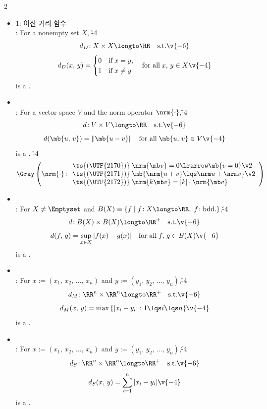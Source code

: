 \documentclass[dvipdfmx,a4paper,titlepage,9pt]{jsarticle}
\begin{document}
\begin{multicols*}{2}
\begin{itemize}[label=-]
\item{}\h1{\scriptsize\Gray: 이산 거리 함수} \\
: For a nonempty set $X$, \v{-4}
$$d_D\!:X\times X\longto \RR\quad\text{s.t.}\v{-6}$$
$$d_D(x,\,y)=\begin{cases}0&\text{if}\;x=y,\\1&\text{if}\;x\neq y\end{cases}\quad\text{for all}\;x,\,y\in X\v{-4}$$
\;\;is a .\\

\item{} \\
: For a vector space $V$ and the norm operator $\nrm{\cdot}$,\v{-4}
$$d\!:V\times V\longto\RR\quad\text{s.t.}\v{-6}$$
$$d(\mb{u,\,v})=\lVert\mb{u-v}\rVert\quad\text{for all}\;\mb{u,\,v}\in V\v{-4}$$
is a . \v{-4}\\
$$\Gray
  \left(\nrm{\cdot}\!:\begin{array}{l}
                      \text{\ts{(\UTF{2170})}}\;\nrm{\mb v}=0\Lrarrow\mb{v=0} \v2 \\
                      \text{\ts{(\UTF{2171})}}\;\mb{\nrm{u+v}\lqs\nrm u+\nrm v} \v2 \\
                      \text{\ts{(\UTF{2172})}}\;\nrm{k\mb v}=|k|\cdot\nrm{\mb v}
                      \end{array}\right)$$

\vfill\null\columnbreak

\item{} \\
: For $X\neq\Emptyset$ and $B(X)\equiv\{f\mid f\!:X\longto\RR,\;f\!:\text{bdd.}\}$,\v{-4}
$$d\!:B(X)\times B(X)\longto\RR^+\quad\text{s.t.}\v{-6}$$
$$d(f,\,g)=\sup_{x\in X}{}|f(x)-g(x)|\quad\text{for all}\;f,\,g\in B(X)\v{-6}$$
is a . \\

\item{} \\
: For $x:=(x_1,\,x_2,\,\ldots,\,x_n)$ and $y:=(y_1,\,y_2,\,\ldots,\,y_n)$,\v{-4}
$$d_M\!: \RR^n\times\RR^n\longto\RR^+\quad\text{s.t.}\v{-6}$$
$$d_M(x,\,y)=\max{}\{|x_i-y_i|:1\lqs i\lqs n\}\v{-4}$$
is a . \\

\item{} \\
: For $x:=(x_1,\,x_2,\,\ldots,\,x_n)$ and $y:=(y_1,\,y_2,\,\ldots,\,y_n)$,\v{-4}
$$d_S\!: \RR^n\times\RR^n\longto\RR^+\quad\text{s.t.}\v{-6}$$
$$d_S(x,\,y)=\sum_{i=1}^n|x_i-y_i|\v{-4}$$
is a . \\


\end{itemize}
\end{multicols*}
\end{document}
